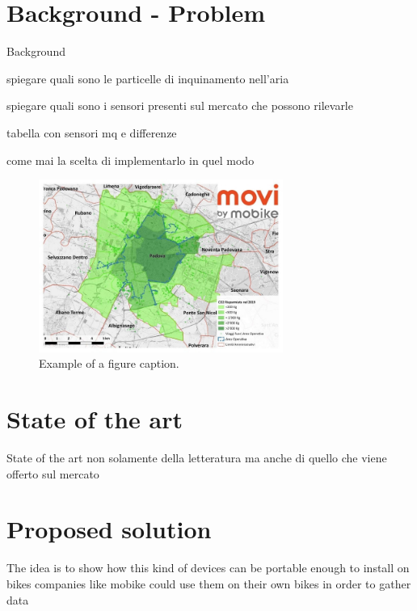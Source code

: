 \documentclass[conference]{IEEEtran}
\begin{document}
\section{Background - Problem}
Background

spiegare quali sono le particelle di inquinamento nell'aria

spiegare quali sono i sensori presenti sul mercato che possono rilevarle

tabella con sensori mq e differenze

come mai la scelta di implementarlo in quel modo

\begin{figure}[htbp]
	\centerline{\includegraphics[width=8cm]{fig3.jpg}}
	\caption{Example of a figure caption.\cite{bibid}}
	\label{fig}
\end{figure}

\section{State of the art}
State of the art non solamente della letteratura ma anche di quello che viene offerto sul mercato

\section{Proposed solution}

	The idea is to show how this kind of devices can be portable enough to install on bikes
	companies like mobike could use them on their own bikes in order to gather data
	
\end{document}
